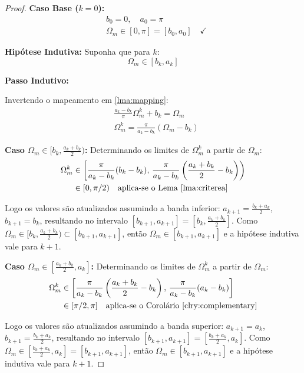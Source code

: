 \begin{proof}

\textbf{Caso Base ($k=0$):}
\begin{align*}
    &b_0 = 0,\quad a_0 = \pi\\
    &\Omega_m \in [0,\pi] = [b_0, a_0] \quad\checkmark
\end{align*}

\textbf{Hipótese Indutiva:} Suponha que para $k$:
$$\Omega_m \in [b_k, a_k]$$

\textbf{Passo Indutivo:}

Invertendo o mapeamento em \ref{lma:mapping}:
\begin{align*}
    &\frac{a_k-b_k}{\pi}\Omega_m^k+b_k = \Omega_m\\
    &\Omega_m^k = \frac{\pi}{a_k-b_k}(\Omega_m - b_k)
\end{align*}

\medskip
\textbf{Caso $\Omega_m \in [b_k,\frac{a_k+b_k}{2})$:} Determinando os limites de $\Omega_m^k$ a partir de $\Omega_m$:
\begin{align*}
    \Omega_m^k &\in \left[\frac{\pi}{a_k-b_k}(b_k-b_k),\,\frac{\pi}{a_k-b_k}\left(\frac{a_k+b_k}{2}-b_k\right)\right)\\
    &\in [0,\pi/2) \quad\text{aplica-se o Lema~\ref{lma:criterea}}
\end{align*}

Logo os valores são atualizados assumindo a banda inferior: $a_{k+1} = \frac{b_k+a_k}{2}$,
$b_{k+1} = b_k$, resultando no intervalo $[b_{k+1}, a_{k+1}] = [b_k, \frac{a_k+b_k}{2}]$.
Como $\Omega_m \in [b_k, \frac{a_k+b_k}{2}) \subset [b_{k+1}, a_{k+1}]$,
então $\Omega_m \in [b_{k+1}, a_{k+1}]$ e a hipótese indutiva vale para $k+1$.

\medskip
\textbf{Caso $\Omega_m \in [\frac{a_k+b_k}{2},a_k]$:} Determinando os limites de $\Omega_m^k$ a partir de $\Omega_m$:
\begin{align*}
    \Omega_m^k &\in \left[\frac{\pi}{a_k-b_k}\left(\frac{a_k+b_k}{2}-b_k\right),\,\frac{\pi}{a_k-b_k}(a_k-b_k)\right]\\
    &\in [\pi/2,\pi] \quad\text{aplica-se o Corolário~\ref{clry:complementary}}
\end{align*}

Logo os valores são atualizados assumindo a banda superior: $a_{k+1} = a_k$,
$b_{k+1} = \frac{b_k+a_k}{2}$, resultando no intervalo $[b_{k+1}, a_{k+1}] = [\frac{b_k+a_k}{2}, a_k]$.
Como $\Omega_m \in [\frac{b_k+a_k}{2}, a_k] = [b_{k+1}, a_{k+1}]$,
então $\Omega_m \in [b_{k+1}, a_{k+1}]$ e a hipótese indutiva vale para $k+1$.
\end{proof}

